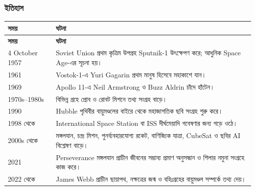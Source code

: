 \subsubsection{ইতিহাস}
\begin{compacttable}
\begin{longtable}{|p{}|p{}|}
\hline\textbf{সময়} & \textbf{ঘটনা}\\\hline\endfirsthead
\hline\textbf{সময়} & \textbf{ঘটনা}\\\hline\endhead
4 October 1957 & Soviet Union প্রথম কৃত্রিম উপগ্রহ Sputnik-1 উৎক্ষেপণ করে; আধুনিক Space Age-এর সূচনা হয়।\\\hline
1961 & Vostok-1-এ Yuri Gagarin প্রথম মানুষ হিসেবে মহাকাশে যান।\\\hline
1969 & Apollo 11-এ Neil Armstrong ও Buzz Aldrin চাঁদে হাঁটেন।\\\hline
1970s--1980s & বিভিন্ন গ্রহে প্রোব ও রোবট মিশনে তথ্য সংগ্রহ বাড়ে।\\\hline
1990 & Hubble পৃথিবীর বায়ুমণ্ডলের বাইরে থেকে মহাজাগতিক ছবি সংগ্রহ শুরু করে।\\\hline
1998 থেকে & International Space Station বা ISS দীর্ঘমেয়াদি গবেষণার জন্য গড়ে ওঠে।\\\hline
2000s থেকে & মঙ্গলযান, চন্দ্র মিশন, পুনর্ব্যবহারযোগ্য রকেট, বাণিজ্যিক যাত্রা, CubeSat ও ছবির AI বিশ্লেষণ বাড়ে।\\\hline
2021 & Perseverance মঙ্গলযান প্রাচীন জীবনের সম্ভাব্য প্রমাণ অনুসন্ধান ও শিলার নমুনা সংগ্রহে কাজ করে।\\\hline
2022 থেকে & James Webb প্রাচীন ছায়াপথ, নক্ষত্রের জন্ম ও বহিঃগ্রহের বায়ুমণ্ডল সম্পর্কে তথ্য দেয়।\\\hline
\end{longtable}
\end{compacttable}
